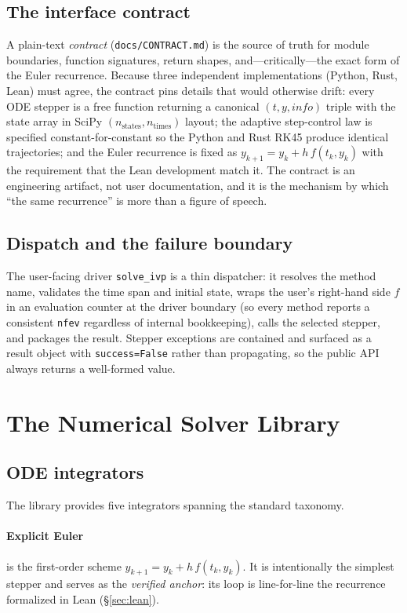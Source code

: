 \documentclass[sigplan,nonacm,screen,review]{acmart}
\begin{document}
\subsection{The interface contract}
A plain-text \emph{contract} (\texttt{docs/CONTRACT.md}) is the source of truth
for module boundaries, function signatures, return shapes, and---critically---the
exact form of the Euler recurrence. Because three independent implementations
(Python, Rust, Lean) must agree, the contract pins details that would otherwise
drift: every ODE stepper is a free function returning a canonical
$(t, y, \mathit{info})$ triple with the state array in SciPy
$(n_\text{states}, n_\text{times})$ layout; the adaptive step-control law is
specified constant-for-constant so the Python and Rust RK45 produce identical
trajectories; and the Euler recurrence is fixed as
$y_{k+1} = y_k + h\,f(t_k, y_k)$ with the requirement that the Lean development
match it. The contract is an engineering artifact, not user documentation, and it
is the mechanism by which ``the same recurrence'' is more than a figure of
speech.

\subsection{Dispatch and the failure boundary}
The user-facing driver \texttt{solve\_ivp} is a thin dispatcher: it resolves the
method name, validates the time span and initial state, wraps the user's
right-hand side $f$ in an evaluation counter at the driver boundary (so every
method reports a consistent \texttt{nfev} regardless of internal bookkeeping),
calls the selected stepper, and packages the result. Stepper exceptions are
contained and surfaced as a result object with \texttt{success=False} rather than
propagating, so the public API always returns a well-formed value.

\section{The Numerical Solver Library}
\label{sec:lib}

\subsection{ODE integrators}
The library provides five integrators spanning the standard taxonomy.

\paragraph{Explicit Euler} is the first-order scheme
$y_{k+1} = y_k + h\,f(t_k, y_k)$. It is intentionally the simplest stepper and
serves as the \emph{verified anchor}: its loop is line-for-line the recurrence
formalized in Lean (\S\ref{sec:lean}).
\end{document}
